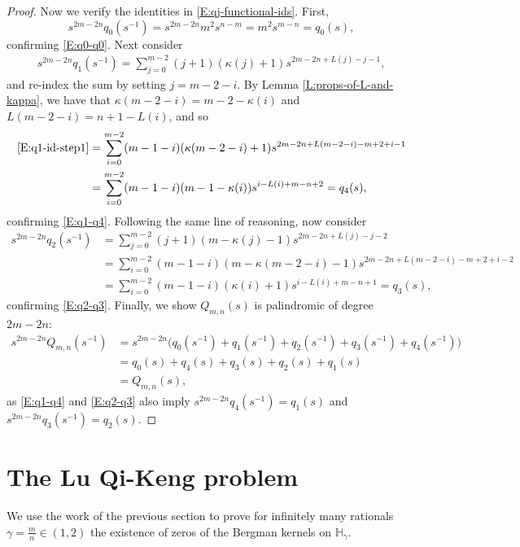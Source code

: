 \documentclass[letterpaper,11pt,reqno]{amsart}
\theoremstyle{plain}
\theoremstyle{definition}
\theoremstyle{remark}
\theoremstyle{remark}
\numberwithin{equation}{section}
\newcommand{\h}{{\mathbb H}}
\begin{document}
\begin{proof}
Now we verify the identities in \eqref{E:qj-functional-ids}.
First,
\begin{equation*}
s^{2m-2n}q_0(s^{-1}) = s^{2m-2n} m^2 s^{n-m} = m^2 s^{m-n} = q_0(s),
\end{equation*}
confirming \eqref{E:q0-q0}.
Next consider
\begin{align}
s^{2m-2n}q_1(s^{-1}) = \sum_{j=0}^{m-2} (j+1)(\kappa(j)+1) s^{2m-2n+L(j)-j-1}, \label{E:q1-id-step1}
\end{align}
and re-index the sum by setting $j = m-2-i$. 
By Lemma \ref{L:props-of-L-and-kappa}, we have that $\kappa(m-2-i) = m-2-\kappa(i)$ and $L(m-2-i) = n + 1 - L(i)$, and so
\begin{align*}
\eqref{E:q1-id-step1} 
&= \sum_{i=0}^{m-2} (m-1-i)(\kappa(m-2-i)+1) s^{2m-2n+L(m-2-i)-m+2+i-1} \\
&= \sum_{i=0}^{m-2} (m-1-i)(m-1-\kappa(i)) s^{i-L(i)+m-n+2} = q_4(s),
\end{align*}
confirming \eqref{E:q1-q4}.
Following the same line of reasoning, now consider
\begin{align*}
s^{2m-2n}q_2(s^{-1}) &= \sum_{j=0}^{m-2} (j+1)(m-\kappa(j)-1) s^{2m-2n+L(j)-j-2} \\
&= \sum_{i=0}^{m-2} (m-1-i)(m-\kappa(m-2-i)-1) s^{2m-2n+L(m-2-i)-m+2+i-2} \\
&= \sum_{i=0}^{m-2} (m-1-i)(\kappa(i)+1) s^{i-L(i)+m-n+1} = q_3(s),
\end{align*}
confirming \eqref{E:q2-q3}.
Finally, we show $Q_{m,n}(s)$ is palindromic of degree $2m-2n$:
\begin{align*}
s^{2m-2n}Q_{m,n}(s^{-1}) &= s^{2m-2n} \big( q_0(s^{-1}) +  q_1(s^{-1}) +  q_2(s^{-1}) +  q_3(s^{-1}) + q_4(s^{-1}) \big) \\
&= q_0(s) + q_4(s) + q_3(s) + q_2(s) + q_1(s) \\
&= Q_{m,n}(s),
\end{align*}
as \eqref{E:q1-q4} and \eqref{E:q2-q3} also imply $s^{2m-2n}q_4(s^{-1}) = q_1(s)$ and $s^{2m-2n}q_3(s^{-1}) = q_2(s)$.
\end{proof}



\section{The Lu Qi-Keng problem}\label{S:zeros-of-the-Bergman-kernel}

We use the work of the previous section to prove for infinitely many rationals $\gamma = \frac{m}{n} \in (1,2)$ the existence of zeros of the Bergman kernels on $\h_\gamma$.
\end{document}
